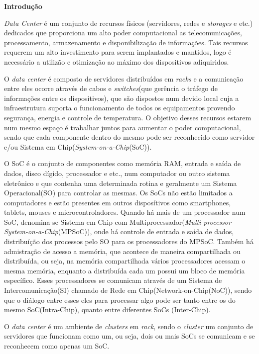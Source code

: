\documentclass[a4paper,12pt]{article}
\begin{document}
\begin{center}
\textbf{{\LARGE Introdução}} \\ \vspace{0.5cm}
\end{center}

\textit{Data Center} é um conjunto de recursos físicos (servidores, redes e \textit{storages} e etc.) dedicados que proporciona um alto poder computacional as telecomunicações, processamento, armazenamento e disponibilização de informações. Tais recursos requerem um alto investimento para serem implantados e mantidos, logo é necessário a utilizão e otimização ao máximo dos dispositivos adiquiridos.

O \textit{data center} é composto de servidores distribuídos em \textit{racks} e a comunicação entre eles ocorre através de cabos e \textit{switches}(que gerência o tráfego de informações entre os dispositivos), que são dispostos num devido local cuja a infraestrutura suporta o funcionamento de todos os equipamentos provendo segurança, energia e controle de temperatura. O objetivo desses recursos estarem num mesmo espaço é trabalhar juntos para aumentar o poder computacional, sendo que cada componente dentro do mesmo pode ser reconhecido como servidor e/ou Sistema em Chip(\textit{System-on-a-Chip}(SoC)).

O SoC é o conjunto de componentes como memória RAM, entrada e saída de dados, disco dígido, processador e etc., num computador ou outro sistema eletrônico e que contenha uma determinada rotina e geralmente um Sistema Operacional(SO) para controlar as mesmas. Os SoCs não estão limitados a computadores e estão presentes em outros disposítivos como smartphones, tablets, mouses e microcontroladores. Quando há mais de um processador num SoC, denomina-se Sistema em Chip com Multiprocessador(\textit{Multi-processor System-on-a-Chip}(MPSoC)), onde há controle de entrada e saída de dados, distribuíção dos processos pelo SO para os processadores do MPSoC. Também há admistração de acesso a memória, que acontece de maneira compartilhada ou distribuída, ou seja, na memória compartilhada vários processadores acessam o mesma memória, enquanto a distribuída cada um possui um bloco de memória específico. Esses processadores se comunicam através de um Sistema de Intercomunicação(SI) chamado de Rede em Chip(Network-on-Chip(NoC)), sendo que o diálogo entre esses eles para processar algo pode ser tanto entre os do mesmo SoC(Intra-Chip), quanto entre diferentes SoCs (Inter-Chip).

O \textit{data center} é um ambiente de \textit{clusters} em \textit{rack}, sendo o \textit{cluster} um conjunto de servidores que funcionam como um, ou seja, dois ou mais SoCs se comunicam e se reconhecem como apenas um SoC.

\end{document}
